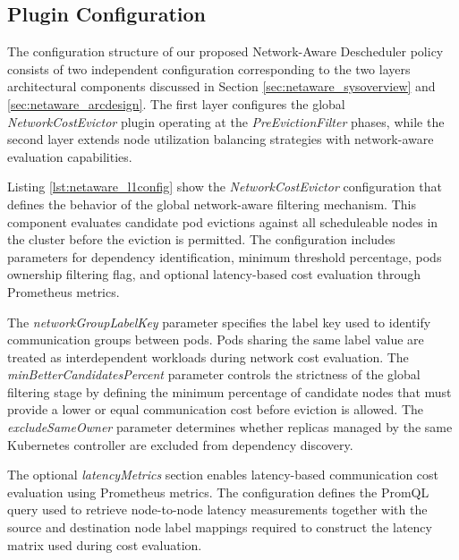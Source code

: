 \subsection{Plugin Configuration}
\label{sec:netaware_config}
The configuration structure of our proposed Network-Aware Descheduler policy consists of two independent configuration corresponding to the two layers architectural components discussed in Section \ref{sec:netaware_sysoverview} and \ref{sec:netaware_arcdesign}. The first layer configures the global \textit{NetworkCostEvictor} plugin operating at the \textit{PreEvictionFilter} phases, while the second layer extends node utilization balancing strategies with network-aware evaluation capabilities.



Listing \ref{lst:netaware_l1config} show the \textit{NetworkCostEvictor} configuration that defines the behavior of the global network-aware filtering mechanism. This component evaluates candidate pod evictions against all scheduleable nodes in the cluster before the eviction is permitted. The configuration includes parameters for dependency identification, minimum threshold percentage, pods ownership filtering flag, and optional latency-based cost evaluation through Prometheus metrics.

The \textit{networkGroupLabelKey} parameter specifies the label key used to identify communication groups between pods. Pods sharing the same label value are treated as interdependent workloads during network cost evaluation. The \textit{minBetterCandidatesPercent} parameter controls the strictness of the global filtering stage by defining the minimum percentage of candidate nodes that must provide a lower or equal communication cost before eviction is allowed. The \textit{excludeSameOwner} parameter determines whether replicas managed by the same Kubernetes controller are excluded from dependency discovery.

The optional \textit{latencyMetrics} section enables latency-based communication cost evaluation using Prometheus metrics. The configuration defines the PromQL query used to retrieve node-to-node latency measurements together with the source and destination node label mappings required to construct the latency matrix used during cost evaluation.

